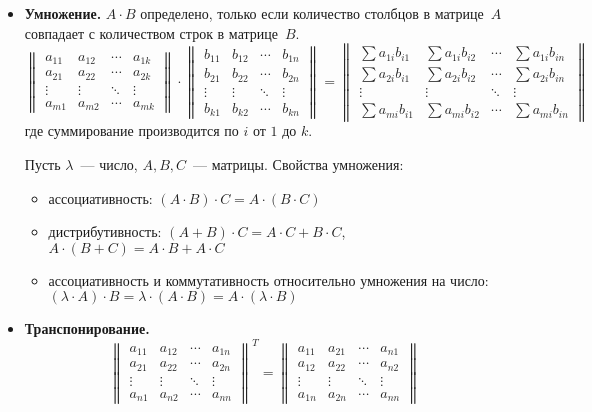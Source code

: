 \begin{itemize}
	\item\textbf{Умножение.} $A \cdot B$ определено, только если количество столбцов в матрице~$A$ совпадает с количеством строк в матрице~$B$.
	\begin{equation*}
	\begin{Vmatrix}
	a_{11} & a_{12} & \cdots & a_{1k} \\ 
	a_{21} & a_{22} & \cdots & a_{2k} \\ 
	\vdots & \vdots & \ddots & \vdots \\ 
	a_{m1} & a_{m2} & \cdots & a_{mk}
	\end{Vmatrix} \cdot
	\begin{Vmatrix}
	b_{11} & b_{12} & \cdots & b_{1n} \\ 
	b_{21} & b_{22} & \cdots & b_{2n} \\ 
	\vdots & \vdots & \ddots & \vdots \\ 
	b_{k1} & b_{k2} & \cdots & b_{kn}
	\end{Vmatrix} =
	\begin{Vmatrix}
	\sum a_{1i}b_{i1} & \sum a_{1i}b_{i2} & \cdots & \sum a_{1i}b_{in} \\
	\sum a_{2i}b_{i1} & \sum a_{2i}b_{i2} & \cdots & \sum a_{2i}b_{in} \\
	\vdots & \vdots & \ddots & \vdots \\
	\sum a_{mi}b_{i1} & \sum a_{mi}b_{i2} & \cdots & \sum a_{mi}b_{in}
	\end{Vmatrix}
	\end{equation*}
	где суммирование производится по $i$ от $1$ до $k$.
	
	Пусть $\lambda$~--- число, $A, B, C$~--- матрицы. Свойства умножения:
	\begin{itemize}
		\item ассоциативность:
		$(A \cdot B) \cdot C = A \cdot (B \cdot C)$
		\item дистрибутивность:
		$(A + B) \cdot C = A \cdot C + B \cdot C$,
		$A \cdot (B + C) = A \cdot B + A \cdot C$
		\item ассоциативность и коммутативность относительно умножения на число:
		$(\lambda \cdot A) \cdot B = \lambda \cdot (A \cdot B) = A \cdot (\lambda \cdot B)$
	\end{itemize}
	
	\item\textbf{Транспонирование.}
	\begin{equation*}
	\begin{Vmatrix}
	a_{11} & a_{12} & \cdots & a_{1n} \\
	a_{21} & a_{22} & \cdots & a_{2n} \\
	\vdots & \vdots & \ddots & \vdots \\
	a_{n1} & a_{n2} & \cdots & a_{nn}
	\end{Vmatrix}^T =
	\begin{Vmatrix}
	a_{11} & a_{21} & \cdots & a_{n1} \\
	a_{12} & a_{22} & \cdots & a_{n2} \\
	\vdots & \vdots & \ddots & \vdots \\
	a_{1n} & a_{2n} & \cdots & a_{nn}
	\end{Vmatrix}
	\end{equation*}
\end{itemize}